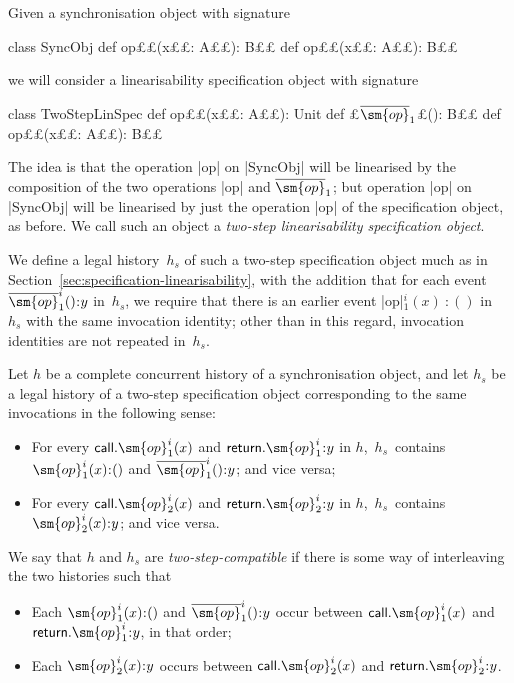 Given a synchronisation object with signature
\begin{scala}
class SyncObj{
  def op££(x££: A££): B££
  def op££(x££: A££): B££
}
\end{scala}
we will consider a linearisability specification object with signature
%
\begin{scala}
class TwoStepLinSpec{
  def op££(x££: A££): Unit
  def £$\overline{\sm{op}}_1$£(): B££
  def op££(x££: A££): B££
}
\end{scala}
%
The idea is that the operation |op| on |SyncObj| will be linearised by the
composition of the two operations |op| and $\overline{\sm{op}}_1$; but
operation |op| on |SyncObj| will be linearised by just the operation
|op| of the specification object, as before.  We call such an object a
\emph{two-step linearisability specification object}.

We define a legal history~$h_s$ of such a two-step specification object much
as in Section~\ref{sec:specification-linearisability}, with the addition that
for each event $\overline{\sm{op}}_1^i()\::y$ in~$h_s$, we require that there
is an earlier event |op|$_1^i(x)\::()$ in~$h_s$ with the same invocation
identity; other than in this regard, invocation identities are not repeated
in~$h_s$.

Let $h$ be a complete concurrent history of a synchronisation object, and let
$h_s$ be a legal history of a two-step specification object corresponding to
the same invocations in the following sense:
%
\begin{itemize}
\item For every $\call.\sm{op}_1^i(x)$ and $\return.\sm{op}_1^i\::y$ in $h$,\,
  $h_s$~contains $\sm{op}_1^i(x)\::()$ and $\overline{\sm{op}}_1^i()\::y$; and
  vice versa;

\item For every $\call.\sm{op}_2^i(x)$ and $\return.\sm{op}_2^i\::y$ in $h$,\,
  $h_s$~contains $\sm{op}_2^i(x)\::y$; and vice versa.
\end{itemize}
%
We say that $h$ and $h_s$ are \emph{two-step-compatible} if there is some way of
interleaving the two histories such that 
%
\begin{itemize}
\item Each $\sm{op}_1^i(x)\::()$ and $\overline{\sm{op}}_1^i()\::y$ occur
  between $\call.\sm{op}_1^i(x)$ and $\return.\sm{op}_1^i\::y$, in that
  order; 

\item Each $\sm{op}_2^i(x)\::y$ occurs between $\call.\sm{op}_2^i(x)$ and
  $\return.\sm{op}_2^i\::y$.
\end{itemize}

